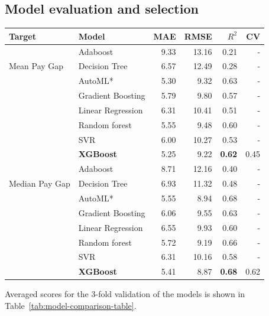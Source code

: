 \subsection{Model evaluation and selection}
\begin{centering}
    \scriptsize{
    \label{tab:model-comparison-table}
    \begin{tabular*}{\linewidth}{l|l|r|r|r|r} \hline
        Target & Model & MAE & RMSE & $R^2$ & CV \\ \hline
        \multirow{3}{4em}{Mean Pay Gap}
& Adaboost & 9.33 & 13.16 & 0.21 & - \\
& Decision Tree & 6.57 & 12.49 & 0.28& -  \\
& AutoML* & 5.30 & 9.32 & 0.63& -  \\
& Gradient Boosting & 5.79 & 9.80 & 0.57& -  \\
& Linear Regression & 6.31 & 10.41 & 0.51& -  \\
& Random forest & 5.55 & 9.48 & 0.60& -  \\
& SVR & 6.00 & 10.27 & 0.53& -  \\
& {\bf XGBoost} & 5.25 & 9.22 & {\bf 0.62} & 0.45  \\ \hline
        \multirow{3}{4em}{Median Pay Gap}
& Adaboost & 8.71 & 12.16 & 0.40 & -  \\
& Decision Tree & 6.93 & 11.32 & 0.48  & -\\
& AutoML* & 5.55 & 8.94 & 0.68 & - \\
& Gradient Boosting & 6.06 & 9.55 & 0.63  & -\\
& Linear Regression & 6.55 & 9.93 & 0.60 & - \\
& Random forest & 5.72 & 9.19 & 0.66 & - \\
& SVR & 6.31 & 10.16 & 0.58 & - \\
& {\bf XGBoost} & 5.41 & 8.87 & {\bf 0.68} & 0.62\\ \hline
    \end{tabular*}}
\end{centering}

Averaged scores for the 3-fold validation of the models is shown in Table\ \ref{tab:model-comparison-table}.

